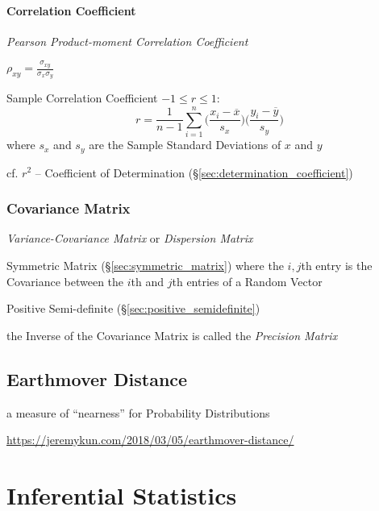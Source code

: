 \paragraph{Correlation Coefficient}\label{sec:correlation_coefficient}\hfill

\emph{Pearson Product-moment Correlation Coefficient}

$\rho_{xy} = \frac{\sigma_{xy}}{\sigma_x \sigma_y}$

Sample Correlation Coefficient $-1 \leq r \leq 1$:
\[
  r = \frac{1}{n-1} \sum_{i=1}^n
    \Big(\frac{x_i - \overline{x}}{s_x}\Big)
    \Big(\frac{y_i - \overline{y}}{s_y}\Big)
\]
where $s_x$ and $s_y$ are the Sample Standard Deviations of $x$ and $y$

\fist cf. $r^2$ -- Coefficient of
Determination (\S\ref{sec:determination_coefficient})



\subsubsection{Covariance Matrix}\label{sec:covariance_matrix}

\emph{Variance-Covariance Matrix} or \emph{Dispersion Matrix}

Symmetric Matrix (\S\ref{sec:symmetric_matrix}) where the $i,j$th entry is the
Covariance between the $i$th and $j$th entries of a Random Vector

Positive Semi-definite (\S\ref{sec:positive_semidefinite})

the Inverse of the Covariance Matrix is called the \emph{Precision Matrix}



\subsection{Earthmover Distance}\label{sec:earthmover_distance}


a measure of ``nearness'' for Probability Distributions

\url{https://jeremykun.com/2018/03/05/earthmover-distance/}



\section{Inferential Statistics}\label{sec:inferential_statistics}

